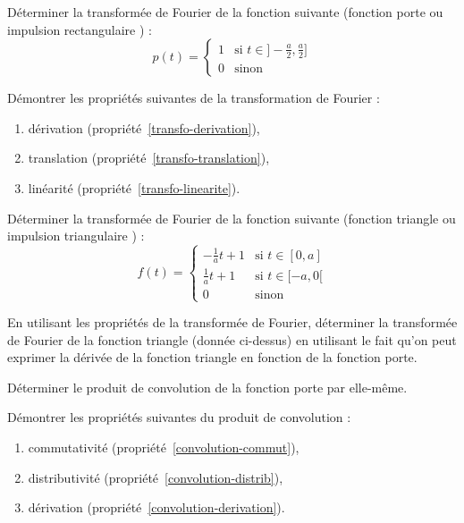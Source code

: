 \exercice
%
Déterminer la transformée de Fourier de la fonction suivante (fonction
{ porte } ou { impulsion rectangulaire }) :
%
\begin{equation*}
p(t) =
\begin{cases}
1 & \mbox{si } t \in ] - \frac{a}{2},\frac a 2 ]\\
0 & \mbox{sinon}
\end{cases}
\end{equation*}

\exercice
%
Démontrer les propriétés suivantes de la transformation de Fourier :
\begin{enumerate}
\item dérivation (propriété~\ref{transfo-derivation}),
\item translation (propriété~\ref{transfo-translation}),
\item linéarité (propriété~\ref{transfo-linearite}).
\end{enumerate}

\exercice Déterminer la transformée de Fourier de la fonction suivante
(fonction { triangle } ou { impulsion triangulaire }) :
%
\begin{equation*}
f(t) =
\begin{cases}
-\frac 1 a  t + 1 & \mbox{si } t \in [ 0, a ]\\
\frac 1 a  t + 1 & \mbox{si } t \in [ -a, 0 [\\
0 & \mbox{sinon}
\end{cases}
\end{equation*}


\exercice En utilisant les propriétés de la transformée de Fourier,
déterminer la transformée de Fourier de la fonction triangle (donnée
ci-dessus) en utilisant le fait qu'on peut exprimer la dérivée de la
fonction triangle en fonction de la fonction porte.


\exercice \label{convol-porte} Déterminer le produit de convolution de la fonction porte
par elle-même.

\exercice 
Démontrer les propriétés suivantes du produit de convolution :
\begin{enumerate}

\item commutativité (propriété~\ref{convolution-commut}),

\item distributivité (propriété~\ref{convolution-distrib}),

\item dérivation (propriété~\ref{convolution-derivation}).

\end{enumerate}

